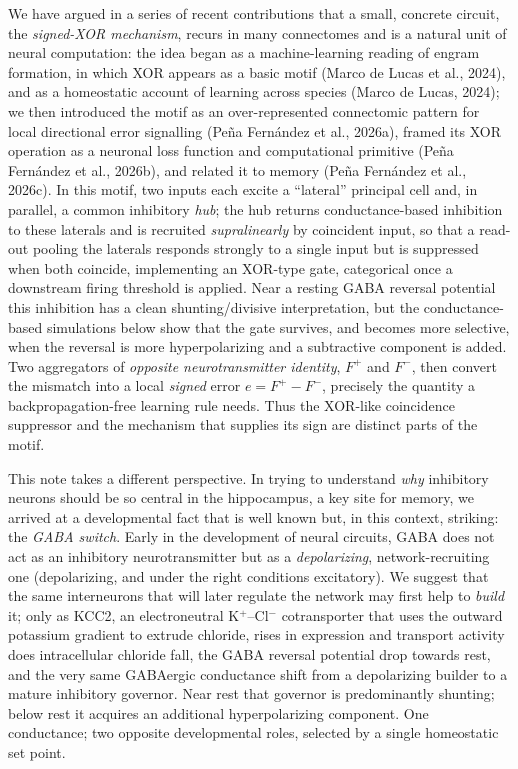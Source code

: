\documentclass[11pt,a4paper]{article}
\begin{document}
We have argued in a series of recent contributions that a small, concrete circuit, the \emph{signed-XOR mechanism}, recurs in many connectomes and is a natural unit of neural computation: the idea began as a machine-learning reading of engram formation, in which XOR appears as a basic motif (Marco de Lucas et al., 2024), and as a homeostatic account of learning across species (Marco de Lucas, 2024); we then introduced the motif as an over-represented connectomic pattern for local directional error signalling (Pe\~na Fern\'andez et al., 2026a), framed its XOR operation as a neuronal loss function and computational primitive (Pe\~na Fern\'andez et al., 2026b), and related it to memory (Pe\~na Fern\'andez et al., 2026c). In this motif, two inputs each excite a ``lateral'' principal cell and, in parallel, a common inhibitory \emph{hub}; the hub returns conductance-based inhibition to these laterals and is recruited \emph{supralinearly} by coincident input, so that a read-out pooling the laterals responds strongly to a single input but is suppressed when both coincide, implementing an XOR-type gate, categorical once a downstream firing threshold is applied. Near a resting GABA reversal potential this inhibition has a clean shunting/divisive interpretation, but the conductance-based simulations below show that the gate survives, and becomes more selective, when the reversal is more hyperpolarizing and a subtractive component is added. Two aggregators of \emph{opposite neurotransmitter identity}, $F^{+}$ and $F^{-}$, then convert the mismatch into a local \emph{signed} error $e=F^{+}-F^{-}$, precisely the quantity a backpropagation-free learning rule needs. Thus the XOR-like coincidence suppressor and the mechanism that supplies its sign are distinct parts of the motif.  

This note takes a different perspective. In trying to understand \emph{why} inhibitory neurons should be so central in the hippocampus, a key site for memory, we arrived at a developmental fact that is well known but, in this context, striking: the \emph{GABA switch}. Early in the development of neural circuits, GABA does not act as an inhibitory neurotransmitter but as a \emph{depolarizing}, network-recruiting one (depolarizing, and under the right conditions excitatory). We suggest that the same interneurons that will later regulate the network may first help to \emph{build} it; only as KCC2, an electroneutral K$^{+}$--Cl$^{-}$ cotransporter that uses the outward potassium gradient to extrude chloride, rises in expression and transport activity does intracellular chloride fall, the GABA reversal potential drop towards rest, and the very same GABAergic conductance shift from a depolarizing builder to a mature inhibitory governor. Near rest that governor is predominantly shunting; below rest it acquires an additional hyperpolarizing component. One conductance; two opposite developmental roles, selected by a single homeostatic set point.
\end{document}
